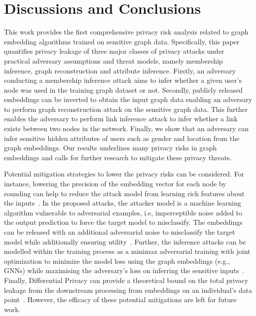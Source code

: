 \vspace{-2mm}
\section{Discussions and Conclusions}
\label{conclusions}

This work provides the first comprehensive privacy risk analysis related to graph embedding algorithms trained on sensitive graph data.
Specifically, this paper quantifies privacy leakage of three major classes of privacy attacks under practical adversary assumptions and threat models, namely membership inference, graph reconstruction and attribute inference.
Firstly, an adversary conducting a membership inference attack aims to infer whether a given user's node was used in the training graph dataset or not.
Secondly, publicly released embeddings can be inverted to obtain the input graph data enabling an adversary to perform graph reconstruction attack on the sensitive graph data.
This further enables the adversary to perform link inference attack to infer whether a link exists between two nodes in the network.
Finally, we show that an adversary can infer sensitive hidden attributes of users such as gender and location from the graph embeddings.
Our results underlines many privacy risks in graph embeddings and calls for further research to mitigate these privacy threats.


Potential mitigation strategies to lower the privacy risks can be considered.
For instance, lowering the precision of the embedding vector for each node by rounding can help to reduce the attack model from learning rich features about the inputs~\cite{membershipinf,nlp}.
In the proposed attacks, the attacker model is a machine learning algorithm vulnerable to adversarial examples, i.e, imperceptible noise added to the output prediction to force the target model to misclassify.
The embeddings can be released with an additional adversarial noise to misclassify the target model while additionally ensuring utility~\cite{attriguard,memguard}.
Further, the inference attacks can be modelled within the training process as a minimax adversarial training with joint optimization to minimize the model loss using the graph embeddings (e.g., GNNs) while maximising the adversary's loss on inferring the sensitive inputs~\cite{advreg,textembleak}.
Finally, Differential Privacy can provide a theoretical bound on the total privacy leakage from the downstream processing from embeddings on an individual's data point~\cite{dptext,dpne}.
However, the efficacy of these potential mitigations are left for future work.






